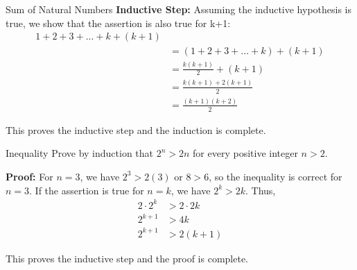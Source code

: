 \documentclass{beamer}
\begin{document}
\begin{frame}{Sum of Natural Numbers}
    \textbf{Inductive Step:}
    Assuming the inductive hypothesis is true, we show that the assertion is also true for k+1:
    \begin{align*}
        1 + 2 + 3 + ... + k + (k+1) \\
        &= (1 + 2 + 3 + ... + k) + (k+1) \\
        &= \frac{k(k+1)}{2} + (k+1) \\
        &= \frac{k(k+1)+2(k+1)}{2} \\
        &= \frac{(k+1)(k+2)}{2}
    \end{align*}
    
    This proves the inductive step and the induction is complete.
\end{frame}

\begin{frame}{Inequality}
    Prove by induction that $2^n > 2n$ for every positive integer $n > 2$. \newline
    
    \textbf{Proof:} For $n = 3$, we have $2^3 > 2(3)$ or $8 > 6$, so the inequality is correct for $n = 3$. \newline
    If the assertion is true for $n = k$, we have $2^k > 2k$. \newline
    Thus,
    \begin{align*}
        2 \cdot 2^k &> 2 \cdot 2k \\
        2^{k+1} &> 4k \\
        2^{k+1} &> 2(k+1)
    \end{align*}
    
    This proves the inductive step and the proof is complete.
\end{frame}
\end{document}
